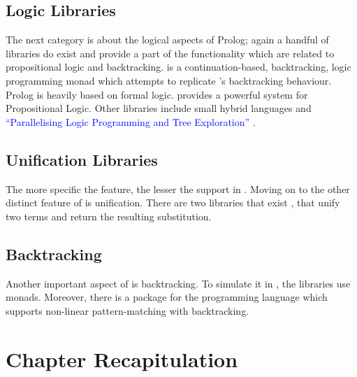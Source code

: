 \documentclass[thesis-solanki.tex]{subfiles}
\begin{document}
\subsection{Logic Libraries}

  The next category is about the logical aspects of Prolog; again a handful of libraries do exist and provide a
  part of the functionality which are related
  to propositional logic and backtracking.
  \cite{logict-lib} is a continuation-based, backtracking, logic programming monad which attempts to replicate
  's
  backtracking behaviour.
  Prolog is heavily based on formal logic.
  \cite{proplogic-lib} provides a powerful system for Propositional Logic.
  Other libraries
  include small hybrid languages \cite{cflp-lib} and
  \textcolor{blue}{``Parallelising Logic Programming and Tree Exploration''}
  \cite{logic-grows-on-trees-lib}.


\subsection{Unification Libraries}

The more specific the feature{\Large,} the lesser the support in .
Moving on to the other distinct feature of  is unification.
There are two libraries that exist \cite{unification-fd-lib},
\cite{cmu-lib} that unify two  terms and return the resulting
substitution.


\subsection{Backtracking}

Another important aspect of  is backtracking.
To simulate it in , the libraries \cite{stream-monad-lib, logicst-lib} use monads.
Moreover, there is a package for the  programming language \cite{egison-lib} which supports
non-linear pattern-matching with backtracking.




\section{Chapter Recapitulation}


\ifMain
\begin{scope}
  \nolinenumbers
  \enotesize
  \par
  \begin{singlespace}
  \setlength{\parskip}{12pt plus 2pt minus 1pt}
  \theendnotes
  \par
  \end{singlespace}
\end{scope}
\fi
\end{document}
